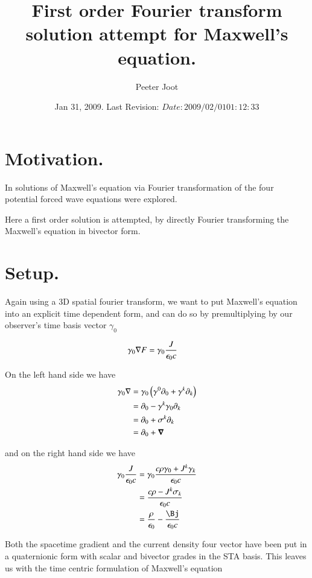 \documentclass{article}
\title{ First order Fourier transform solution attempt for Maxwell's equation. }
\author{Peeter Joot}
\date{ Jan 31, 2009.  Last Revision: $Date: 2009/02/01 01:12:33 $ }
\begin{document}
\maketitle{}

\tableofcontents

\section{ Motivation. }

In \cite{PJfourierMaxwellSecondOrder} solutions of Maxwell's equation
via Fourier transformation of the four potential forced wave equations were
explored.

Here a first order solution is attempted, by directly Fourier transforming
the Maxwell's equation in bivector form.

\section{ Setup. }

Again using a 3D spatial fourier transform, we want to put Maxwell's equation into an explicit time dependent form, and can do so by
premultiplying by our observer's time basis vector $\gamma_0$

\begin{align*}
\gamma_0 \nabla F &= \gamma_0 \frac{J }{\epsilon_0 c}
\end{align*}

On the left hand side we have
\begin{align*}
\gamma_0 \nabla 
&= \gamma_0 \left( \gamma^0 \partial_0 + \gamma^k \partial_k \right) \\
&= \partial_0 - \gamma^k \gamma_0 \partial_k \\
&= \partial_0 + \sigma^k \partial_k \\
&= \partial_0 + \boldsymbol{\nabla} \\
\end{align*}

and on the right hand side we have
\begin{align*}
\gamma_0 \frac{J }{\epsilon_0 c}
&= \gamma_0 \frac{c \rho \gamma_0 + J^k \gamma_k }{\epsilon_0 c} \\
&= \frac{c \rho - J^k \sigma_k }{\epsilon_0 c} \\
&= \frac{\rho}{\epsilon_0} - \frac{\Bj}{\epsilon_0 c} \\
\end{align*}

Both the spacetime gradient and the current density four vector have been put in a quaternionic form with scalar and bivector grades in the 
STA basis.  This leaves us with the time centric formulation of Maxwell's equation
\end{document}
